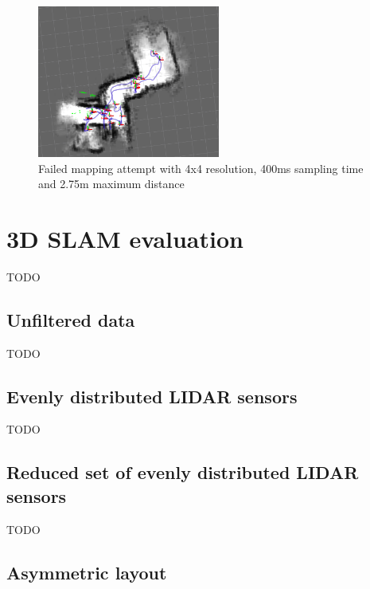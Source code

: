 \begin{figure}[!h]
    \centering
	\includegraphics[height=50mm, keepaspectratio]{figures/08_failed_map.png}
    \caption{Failed mapping attempt with 4x4 resolution, 400ms sampling time and 2.75m 
    maximum distance}
    \label{fig:08_failed_map}
\end{figure}





\section{3D SLAM evaluation}
TODO
\subsection{Unfiltered data}
TODO
\subsection{Evenly distributed LIDAR sensors}
TODO
\subsection{Reduced set of evenly distributed LIDAR sensors}
TODO
\subsection{Asymmetric layout}
